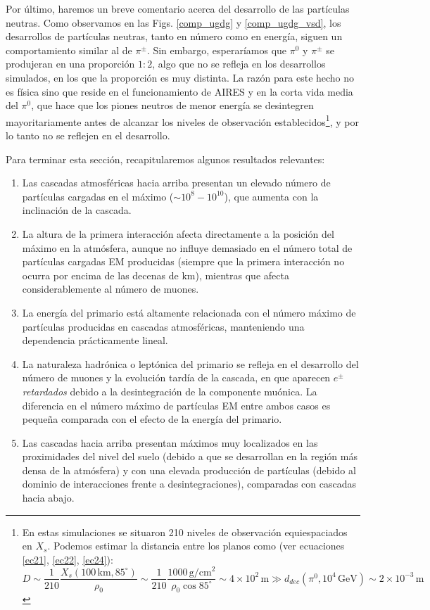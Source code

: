 \documentclass[11 pt, a4paper]{article} %
\numberwithin{equation}{section}
\numberwithin{figure}{section}
\numberwithin{table}{section}
\begin{document}
Por último, haremos un breve comentario acerca del desarrollo de las partículas neutras. Como observamos en las Figs. \ref{comp_ugdg} y \ref{comp_ugdg_vsd}, los desarrollos de partículas neutras, tanto en número como en energía, siguen un comportamiento similar al de $\pi^\pm$. Sin embargo, esperaríamos que $\pi^0$ y $\pi^\pm$ se produjeran en una proporción $1:2$, algo que no se refleja en los desarrollos simulados, en los que la proporción es muy distinta. La razón para este hecho no es física sino que reside en el funcionamiento de AIRES y en la corta vida media del $\pi^0$, que hace que los piones neutros de menor energía se desintegren mayoritariamente antes de alcanzar los niveles de observación establecidos\footnote{ En estas simulaciones se situaron 210 niveles de observación equiespaciados en $X_s$. Podemos estimar la distancia entre los planos como (ver ecuaciones \ref{ec21}, \ref{ec22}, \ref{ec24}): $$D \sim \frac{1}{210}\frac{X_s(100\,\mathrm{km}, 85^\circ)}{\rho_0}\sim \frac{1}{210}\frac{1000\,\mathrm{g/cm^2}}{\rho_0\cos85^\circ}\sim4\times 10^2\,\mathrm{m}\gg d_{dec}(\pi^0, 10^4\,\mathrm{GeV})\sim2\times10^{-3}\,\mathrm{m}$$}, y por lo tanto no se reflejen en el desarrollo.

Para terminar esta sección, recapitularemos algunos resultados relevantes:

\begin{enumerate}
	\item Las cascadas atmosféricas hacia arriba presentan un elevado número de partículas cargadas en el máximo ($\sim 10^8-10^{10}$), que aumenta con la inclinación de la cascada. 
	\item La altura de la primera interacción afecta directamente a la posición del máximo en la atmósfera, aunque no influye demasiado en el número total de partículas cargadas EM producidas (siempre que la primera interacción no ocurra por encima de las decenas de $\mathrm{km}$), mientras que afecta considerablemente al número de muones.
	\item La energía del primario está altamente relacionada con el número máximo de partículas producidas en cascadas atmosféricas, manteniendo una dependencia prácticamente lineal.
	\item La naturaleza hadrónica o leptónica del primario se refleja en el desarrollo del número de muones y la evolución tardía de la cascada, en que aparecen $e^\pm$ \textit{retardados} debido a la desintegración de la componente muónica. La diferencia en el número máximo de partículas EM entre ambos casos es pequeña comparada con el efecto de la energía del primario.
	\item Las cascadas hacia arriba presentan máximos muy localizados en las proximidades del nivel del suelo (debido a que se desarrollan en la región más densa de la atmósfera) y con una elevada producción de partículas (debido al dominio de interacciones frente a desintegraciones), comparadas con cascadas hacia abajo.
\end{enumerate}
\clearpage
\end{document}
